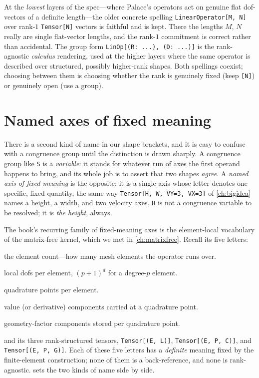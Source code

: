 \begin{notationbox}
At the \emph{lowest} layers of the spec---where Palace's operators act on
genuine flat dof-vectors of a definite length---the older concrete spelling
\lstinline[style=l4style]|LinearOperator[M, N]| over rank-$1$
\lstinline[style=l4style]|Tensor[N]| vectors is faithful and is kept. There
the lengths $M$, $N$ really are single flat-vector lengths, and the rank-$1$
commitment is correct rather than accidental. The group form
\lstinline[style=l4style]|LinOp[(R: ...), (D: ...)]| is the rank-agnostic
\emph{calculus} rendering, used at the higher layers where the same operator
is described over structured, possibly higher-rank shapes. Both spellings
coexist; choosing between them is choosing whether the rank is genuinely
fixed (keep \lstinline[style=l4style]|[N]|) or genuinely open (use a group).
\end{notationbox}

\section{Named axes of fixed meaning}
\label{sec:sh-fixedaxes}

There is a second kind of name in our shape brackets, and it is easy to
confuse with a congruence group until the distinction is drawn sharply. A
congruence group like \texttt{S} is a \emph{variable}: it stands for whatever
run of axes the first operand happens to bring, and its whole job is to assert
that two shapes \emph{agree}. A \emph{named axis of fixed meaning} is the
opposite: it is a single axis whose letter denotes one specific, fixed
quantity, the same way \lstinline[style=l4style]|Tensor[H, W, VY=3, VX=3]| of
\cref{ch:bigidea} names a height, a width, and two velocity axes. \texttt{H}
is not a congruence variable to be resolved; it is \emph{the height}, always.

The book's recurring family of fixed-meaning axes is the element-local
vocabulary of the matrix-free kernel, which we met in \cref{ch:matrixfree}.
Recall its five letters:
\begin{description}[leftmargin=1.6em, style=nextline, nosep]
\item[\texttt{E}] the element count---how many mesh elements the operator runs over.
\item[\texttt{L}] local dofs per element, $(p+1)^d$ for a degree-$p$ element.
\item[\texttt{P}] quadrature points per element.
\item[\texttt{C}] value (or derivative) components carried at a quadrature point.
\item[\texttt{G}] geometry-factor components stored per quadrature point.
\end{description}
and its three rank-structured tensors, \lstinline[style=l4style]|Tensor[(E, L)]|,
\lstinline[style=l4style]|Tensor[(E, P, C)]|, and
\lstinline[style=l4style]|Tensor[(E, P, G)]|. Each of these five letters has a
\emph{definite} meaning fixed by the finite-element construction; none of them
is a back-reference, and none is rank-agnostic.
 sets the two kinds of name side by side.

